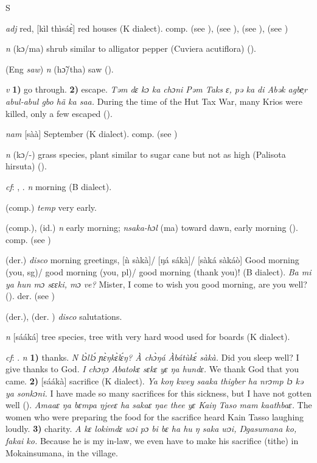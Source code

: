 \begin{letter}{S}

 \textit{adj} red, [kìl thìsáɛ̀] red houses (K dialect). comp.  (see ),  (see ),  (see ),  (see ) 

 \textit{n} (kɔ/ma) shrub similar to alligator pepper (Cuviera acutiflora) (\citealt{Pichl1967}). 

 (Eng \textit{saw}) \textit{n} (hɔ̃/tha) saw (\citealt{Pichl1967}).

 \textit{v} \textbf{1)} go through. \textbf{2)} escape. \textit{Təm dɛ kɔ ka chɔni Pəm Taks ɛ, pə ka di Abək agbe̹r abul-abul gbo hã ka saa.} During the time of the Hut Tax War, many Krios were killed, only a few escaped (\citealt{Pichl1967}). 

 \textit{nam} [sàà] September (K dialect). comp.  (see ) 

 \textit{n} (kɔ/-) grass species, plant similar to sugar cane but not as high (Palisota hirsuta) (\citealt{Pichl1967}). 

 \textit{cf}: , . \textit{n} morning (B dialect). 

 (comp.) \textit{temp} very early.

 (comp.), (id.) \textit{n} early morning; \textit{nsaka-hɔl} (ma) toward dawn, early morning (\citealt{Pichl1967}). comp.  (see ) 

 (der.) \textit{disco} morning greetings, [ǹ sàkà]/ [ŋá sákà]/ [sàká sàkáò] Good morning (you, sg)/ good morning (you, pl)/ good morning (thank you)! (B dialect). \textit{Ba mi ya hun mɔ sɛɛki, mɔ ve?} Mister, I come to wish you good morning, are you well? (\citealt{Pichl1967}). der.  (see )

 (der.), (der. ) \textit{disco} salutations.

 \textit{n} [sááká] tree species, tree with very hard wood used for boards (K dialect).

 \textit{cf}: . \textit{n} \textbf{1)} thanks. \textit{N lɔ̀llɔ́ ɲɛ̀ŋkɛ̀lɛ́ŋ? À chɔ̀ŋá Àbátùkɛ́ sàkà.} Did you sleep well? I give thanks to God. \textit{I chɔŋɔ Abatokɛ sɛkɛ yɛ ŋa hundɛ.} We thank God that you came. \textbf{2)} [sáákà] sacrifice (K dialect). \textit{Ya koŋ kwey saaka thigber ha nrɔmp lɔ kə ya sonkɔni.} I have made so many sacrifices for this sickness, but I have not gotten well (\citealt{Pichl1967}). \textit{Amaaɛ ŋa bɛmpa ŋjeeɛ ha sakaɛ ŋae thee yɛ Kaiŋ Taso mam kaathbaɛ.} The women who were preparing the food for the sacrifice heard Kain Tasso laughing loudly. \textbf{3)} charity. \textit{A kɛ lokimdɛ wɔi pɔ bi bɛ ha hu ŋ saka wɔi, Ŋgasumana ko, fakai ko.} Because he is my in-law, we even have to make his sacrifice (tithe) in Mokainsumana, in the village.


\end{letter}
